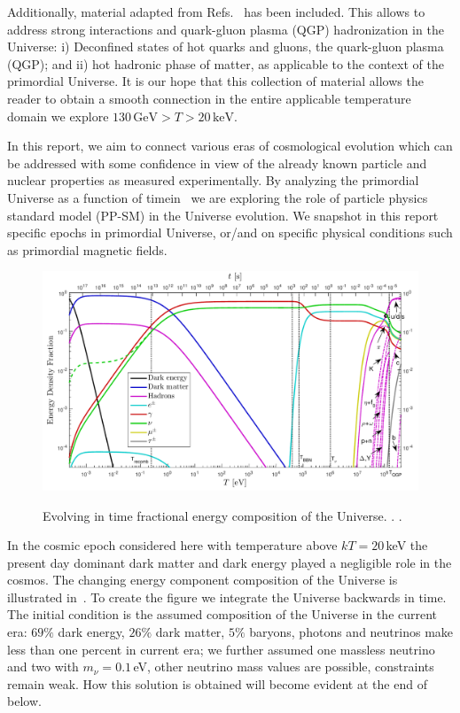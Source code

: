 Additionally, material adapted from Refs.~\cite{Letessier:2002ony,Rafelski:2015cxa,Rafelski:2016hnq,Rafelski:2019twp} has been included. This allows to address strong interactions and quark-gluon plasma (QGP) hadronization in the Universe: i) Deconfined states of hot quarks and gluons, the quark-gluon plasma (QGP); and ii) hot hadronic phase of matter, as applicable to the context of the primordial Universe. It is our hope that this collection of material allows the reader to obtain a smooth connection in the entire applicable temperature domain we explore $130\,\mathrm{GeV}>T>20\,\mathrm{keV}$.

In this report, we aim to connect various eras of cosmological evolution which can be addressed with some confidence in view of the already known particle and nuclear properties as measured experimentally. By analyzing the primordial Universe as a function of timein~ we are exploring the role of particle physics standard model (PP-SM) in the Universe evolution. We snapshot in this report specific epochs in primordial Universe, or/and on specific physical conditions such as primordial magnetic fields.

\begin{figure}
\vspace*{0.62\linewidth}\includegraphics[width=\linewidth]{01-introduction/Figures/energyFractions.pdf}\label{fig:energy:frac}
\caption{Evolving in time fractional energy composition of the Universe. . .}
 \end{figure}

In the cosmic epoch considered here with temperature above $kT=20$\,keV the present day dominant dark matter and dark energy played a negligible role in the cosmos. The changing energy component composition of the Universe is illustrated in~. To create the figure we integrate the Universe backwards in time. The initial condition is the assumed composition of the Universe in the current era: $69\%$ dark energy, $26\%$ dark matter, $5\%$ baryons, photons and neutrinos make less than one percent in current era; we further assumed one massless neutrino and two with $m_\nu=0.1$\,eV, other neutrino mass values are possible, constraints remain weak. How this solution is obtained will become evident at the end of  below. 

